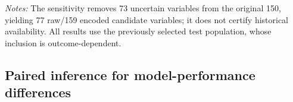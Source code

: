 \documentclass[10pt]{article}
\begin{document}
\begin{table}[!ht]
\centering
\caption{Original versus conservative-candidate feature sensitivity, holding the seed, cohorts and estimator settings fixed. Lower Brier scores are better.}
\label{tab:r2_conservative_features}
\vspace{2pt}
{\footnotesize \textit{Notes:} The sensitivity removes 73 uncertain variables from the original 150, yielding 77 raw/159 encoded candidate variables; it does not certify historical availability. All results use the previously selected test population, whose inclusion is outcome-dependent.}
\end{table}


\subsection{Paired inference for model-performance differences}
\label{sec:pairedinference}
\end{document}
